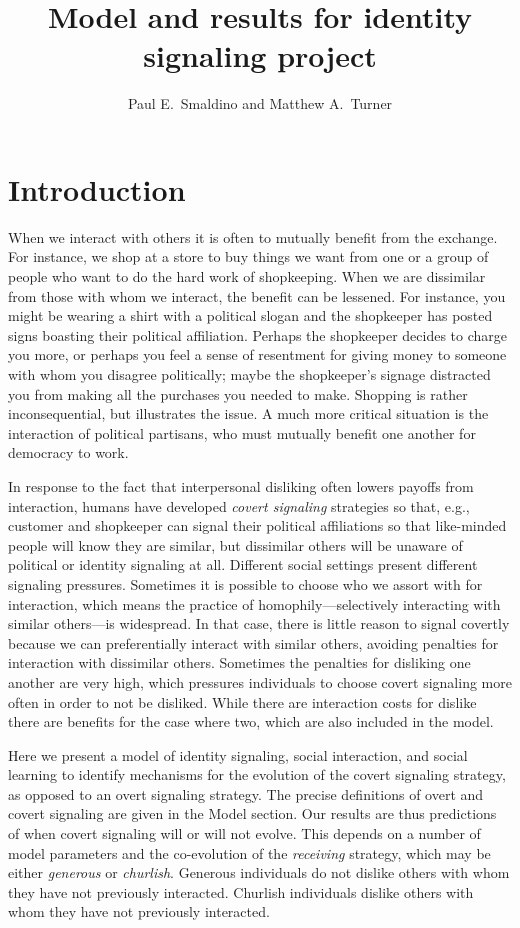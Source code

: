 \documentclass[11pt,letterpaper]{article}
\title{Model and results for identity signaling project}
\author{{Paul E.~Smaldino and Matthew A.~Turner}}
\begin{document}
\maketitle

\section{Introduction}

When we interact with others it is often to mutually benefit from the
exchange. For instance, we shop at a store to buy things we want from one or
a group of people who want to do the hard work of shopkeeping. When we are
dissimilar from those with whom we interact, the benefit can be lessened.
For instance, you might be wearing a shirt with a political slogan and 
the shopkeeper has posted signs boasting their political affiliation. Perhaps
the shopkeeper decides to charge you more, or perhaps you feel a sense of 
resentment for giving money to someone with whom you disagree politically;
maybe the shopkeeper's signage distracted you from making all the purchases 
you needed to make. Shopping is rather inconsequential, but illustrates the issue. 
A much more critical situation is the interaction of political partisans, who
must mutually benefit one another for democracy to work.

In response to the fact that
interpersonal disliking often lowers payoffs from interaction, humans have
developed \emph{covert signaling} strategies so that, e.g.,
customer and shopkeeper can signal their political affiliations so that like-minded
people will know they are similar, but dissimilar others will be unaware
of political or identity signaling at all. Different social settings present
different signaling pressures. Sometimes it is possible to choose who we assort
with for interaction, which means the practice of homophily---selectively
interacting with similar others---is widespread. In that case, there is little
reason to signal covertly because we can preferentially 
interact with similar others, avoiding penalties for interaction with 
dissimilar others. Sometimes the penalties for
disliking one another are very high, which pressures individuals to choose
covert signaling more often in order to not be disliked. While there are
interaction costs for dislike there are benefits for the case where two, which are
also included in the model.

Here we present a model of identity signaling, social interaction,
and social learning to identify mechanisms for the evolution of the covert 
signaling strategy, as opposed to an overt signaling strategy. The precise 
definitions of overt and covert signaling are given in the Model section.
Our results are thus predictions of when covert signaling will or
will not evolve. This depends on a number of model parameters and the 
co-evolution of the \emph{receiving} strategy, which may be either \emph{generous}
or \emph{churlish}. Generous individuals do not dislike
others with whom they have not previously interacted. Churlish individuals 
dislike others with whom they have not previously interacted.
\end{document}
